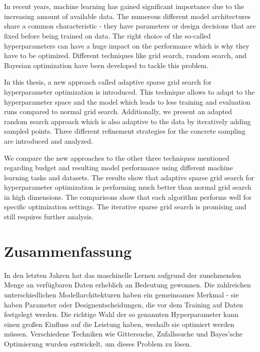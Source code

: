 \chapter{\abstractname}

In recent years, machine learning has gained significant importance due to the increasing amount of available data. The numerous different model architectures share a common characteristic - they have parameters or design decisions that are fixed before being trained on data. The right choice of the so-called hyperparameters can have a huge impact on the performance which is why they have to be optimized. Different techniques like grid search, random search, and Bayesian optimization have been developed to tackle this problem. \newline

In this thesis, a new approach called adaptive sparse grid search for hyperparameter optimization is introduced. This technique allows to adapt to the hyperparameter space and the model which leads to less training and evaluation runs compared to normal grid search. Additionally, we present an adapted random search approach which is also adaptive to the data by iteratively adding sampled points. Three different refinement strategies for the concrete sampling are introduced and analyzed. \newline

We compare the new approaches to the other three techniques mentioned regarding budget and resulting model performance using different machine learning tasks and datasets. The results show that adaptive sparse grid search for hyperparameter optimization is performing much better than normal grid search in high dimensions. The comparisons show that each algorithm performs well for specific optimization settings. The iterative sparse grid search is promising and still requires further analysis.

\chapter*{Zusammenfassung} 

In den letzten Jahren hat das maschinelle Lernen aufgrund der zunehmenden Menge an verfügbaren Daten erheblich an Bedeutung gewonnen. Die zahlreichen unterschiedlichen Modellarchitekturen haben ein gemeinsames Merkmal - sie haben Parameter oder Designentscheidungen, die vor dem Training auf Daten festgelegt werden. Die richtige Wahl der so genannten Hyperparameter kann einen großen Einfluss auf die Leistung haben, weshalb sie optimiert werden müssen. Verschiedene Techniken wie Gittersuche, Zufallssuche und Bayes'sche Optimierung wurden entwickelt, um dieses Problem zu lösen. \newline

